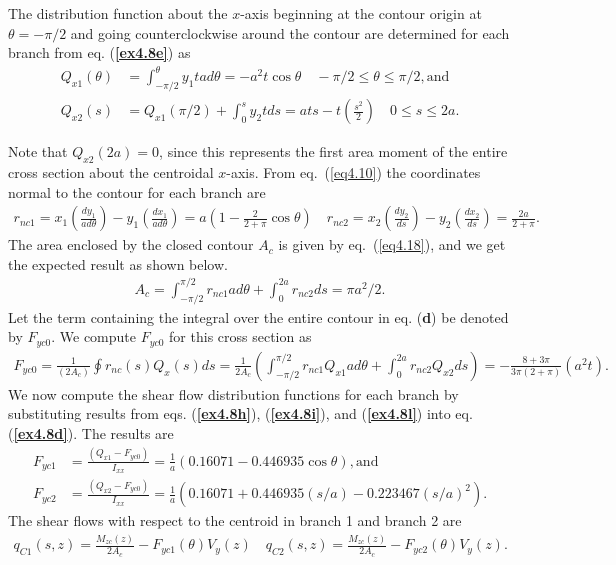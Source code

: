 \documentclass{AeroStructure-ERJohnson}
\begin{document}
\begin{example*}
\removelastskip

The distribution function about the $x$-axis beginning at the contour origin at $\theta=-\pi/2$ and going counterclockwise around the contour are determined for each branch from eq. (\textbf{\ref{ex4.8e}}) as
\begin{align}\label{ex4.8h}
Q_{x 1}(\theta)&=\int_{-\pi/2}^{\theta} y_{1} t a d \theta=-a^{2} t \cos \theta \quad-\pi/2 \leq \theta \leq \pi/2, \text{and}\\
Q_{x 2}(s)&=Q_{x 1}(\pi/2)+\int_{0}^{s} y_{2} t d s=a t s-t\left(\frac{s^{2}}{2}\right) \quad 0 \leq s \leq 2 a.\label{ex4.8i}
\end{align}
\vspace*{4pt}
\clearpage

\noindent Note that $Q_{x 2}(2 a)=0$, since this represents the first area moment of the entire cross section about the centroidal $x$-axis. From eq.~(\ref{eq4.10}) the coordinates normal to the contour for each branch are
\begin{align}\label{ex4.8j}
r_{n c 1}=x_{1}\left(\frac{d y_{1}}{a d \theta}\right)-y_{1}\left(\frac{d x_{1}}{a d \theta}\right)=a\left(1-\frac{2}{2+\pi} \cos \theta\right) \quad r_{n c 2}=x_{2}\left(\frac{d y_{2}}{d s}\right)-y_{2}\left(\frac{d x_{2}}{d s}\right)=\frac{2 a}{2+\pi}.
\end{align}
The area enclosed by the closed contour $A_{c}$ is given by eq.~(\ref{eq4.18}), and we get the expected result as shown below.
\begin{align}\label{ex4.8k}
A_{c}=\int_{-\pi/2}^{\pi/2} r_{n c 1} a d \theta+\int_{0}^{2a} r_{n c 2} d s=\pi a^{2}/2.
\end{align}
Let the term containing the integral over the entire contour in eq. (\textbf{d}) be denoted by $F_{y c 0}$. We compute $F_{y c 0}$ for this cross section as
\begin{align}\label{ex4.8l}
F_{y c 0}=\frac{1}{\left(2 A_{c}\right)} \oint\! r_{n c}(s) Q_{x}(s) d s=\frac{1}{2 A_{c}}\left(\int_{-\pi/2}^{\pi/2} r_{n c 1} Q_{x 1} a d \theta+\int_{0}^{2a} r_{n c 2} Q_{x 2} d s\right)=-\frac{8+3 \pi}{3 \pi(2+\pi)}(a^{2} t).
\end{align}
We now compute the shear flow distribution functions for each branch by substituting results from eqs. (\textbf{\ref{ex4.8h}}), (\textbf{\ref{ex4.8i}}), and (\textbf{\ref{ex4.8l}}) into eq. (\textbf{\ref{ex4.8d}}). The results are
\begin{align}\label{ex4.8m}
F_{y c 1}&=\frac{\left(Q_{x 1}-F_{y c 0}\right)}{I_{x x}}=\frac{1}{a}(0.16071-0.446935 \cos \theta), \text{and}
\\
F_{y c 2}&=\frac{(Q_{x 2}-F_{y c 0})}{I_{x x}}=\frac{1}{a}(0.16071+0.446935(s/a)-0.223467(s/ a)^{2}).\label{ex4.8n}
\end{align}
The shear flows with respect to the centroid in branch 1 and branch 2 are
\begin{align}\label{ex4.8o}
q_{C 1}(s, z)=\frac{M_{z c}(z)}{2 A_{c}}-F_{y c 1}(\theta) V_{y}(z) \quad q_{C 2}(s, z)=\frac{M_{z c}(z)}{2 A_{c}}-F_{y c 2}(\theta) V_{y}(z).
\end{align}


\end{example*}
\end{document}
